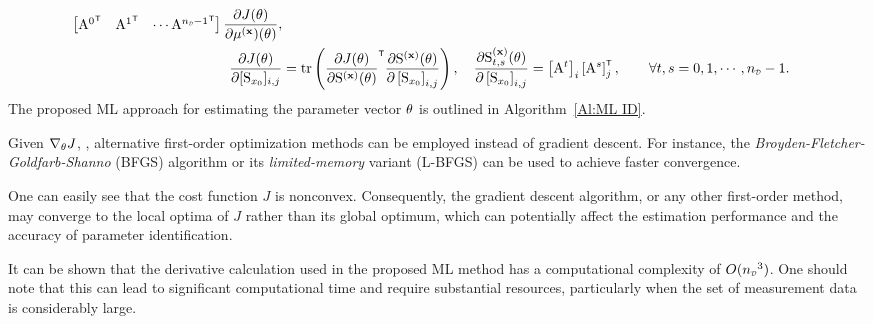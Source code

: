 \begin{align}
\begin{bmatrix}
            {\mxA^{0}}^{\tr} & {\mxA^{1}}^\tr & \cdots {\mxA^{\nsD-1}}^\tr
        \end{bmatrix} \pdv{J(\vctheta)}{\mu^{(\mathbf{x}})(\vctheta)},\label{eq:J derivative mux0}\\
        \pdv{J(\vctheta)}{[\mxS_{x_0}]_{i,j}} &= \trace\left(\pdv{J(\vctheta)}{\mxS^{(\mathbf{x})}(\vctheta)}^\tr \pdv{\mxS^{(\mathbf{x})}(\vctheta)}{\left[ \mxS_{x_0} \right]_{i,j}} \right), \quad
        \pdv{\mxS^{(\mathbf{x})}_{t,s}(\vctheta)}{\left[ \mxS_{x_0} \right]_{i,j}} = \left[ \mxA^t \right]_i \left[ \mxA^s \right]_j^\tr, \qquad \forall t,s = 0,1,\cdots,\nD-1.\label{eq:J derivative Sx0}
\end{align}
\fi
The proposed ML approach for estimating the parameter vector ${ \mathrm{\theta} }$ is outlined in Algorithm~\ref{Al:ML ID}.

\begin{remark}
    Given $\nabla_{ \mathrm{\theta} } J$, , alternative first-order optimization methods \cite{nocedal1999numerical} can be employed instead of gradient descent. For instance, the \emph{Broyden-Fletcher-Goldfarb-Shanno} (BFGS) algorithm or its \emph{limited-memory} variant (L-BFGS) can be used to achieve faster convergence. 
\end{remark}
\begin{remark}
One can easily see that the cost function $J$ is nonconvex. Consequently, the gradient descent algorithm, or any other first-order method, may converge to the local optima of $J$ rather than its global optimum, which can potentially affect the estimation performance and the accuracy of parameter identification.
\end{remark}
\begin{remark}\label{rem:comp_comp}
It can be shown that the derivative calculation used in the proposed ML method has a computational complexity of $O(\nD^3)$. One should note that this can lead to significant computational time and require substantial resources, particularly when the set of measurement data is considerably large.
\end{remark}

